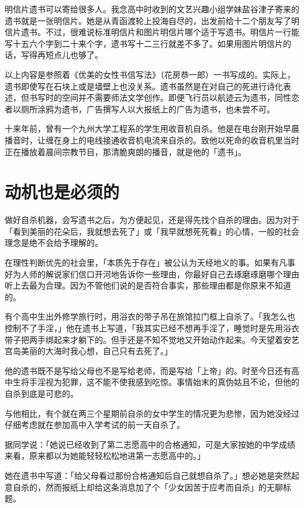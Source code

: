 \documentclass[UTF8]{ctexart}
\begin{document}
明信片遗书可以寄给很多人。我念高中时收到的文艺兴趣小组学妹盐谷津子寄来的遗书就是一张明信片。她是从青函渡轮上投海自尽的，出发前给十二个朋友写了明信片遗书。不过，很难说标准明信片和图片明信片哪个适于写遗书。明信片一行能写十五六个字到二十来个字，遗书写十二三行就差不多了。如果用图片明信片的话，写得再短点儿也够了。

\bigbreak

以上内容是参照着《优美的女性书信写法》（花房恭一郎）一书写成的。实际上，遗书即使写在石块上或是墙壁上也没关系。遗书虽然是在对自己的死进行诗化表述，但书写时的空间并不需要师法文学创作。即便飞行员以航迹云为遗书，同性恋者以厕所涂鸦为遗书，广告撰写人以大报纸上的广告为遗书，也未尝不可。

十来年前，曾有一个九州大学工程系的学生用收音机自杀。他是在电台刚开始早晨播音时，让缠在身上的电线接通收音机电流来自杀的。致他以死命的收音机里当时正在播放着晨间宗教节目，那清脆爽朗的播音，就是他的「遗书」。

\section{动机也是必须的}

做好自杀机器，会写遗书之后，为方便起见，还是得先找个自杀的理由。因为对于「看到美丽的花朵后，我就想去死了」或「我早就想死死看」的心情，一般的社会理念是绝不会给予理解的。

在理性判断优先的社会里，「本质先于存在」被公认为天经地义的事。如果有凡事好为人师的解说家们信口开河地告诉你一些理由，你最好自己去琢磨琢磨哪个理由听上去最为合理。因为不管他们说的是否符合事实，那些理由都是你原来不知道的。

有个高中生出外修学旅行时，用浴衣的带子吊在旅馆拉门框上自杀了。「我怎么也控制不了手淫，」他在遗书上写道，「我其实已经不想再手淫了，睡觉时是先用浴衣带子把两手绑起来才躺下的。但手还是不知不觉地又开始动作起来。今天望着安艺宫岛美丽的大海时我心想，自己只有去死了。」

他的遗书既不是写给父母也不是写给老师，而是写给「上帝」的。时至今日还有高中生将手淫视为犯罪，这不能不使我感到吃惊。事情始末的真伪姑且不论，但他的自杀到底是可悲的。

与他相比，有个就在两三个星期前自杀的女中学生的情况更为悲惨，因为她没经过仔细考虑就在参加高中入学考试的前一天自杀了。

据同学说：「她说已经收到了第二志愿高中的合格通知，可是大家按她的中学成绩来看，原来都以为她能轻轻松松地进第一志愿高中的。」

她在遗书中写道：「给父母看过那份合格通知后自己就想自杀了。」想必她是突然起意自杀的，然而报纸上却给这条消息加了个「少女因苦于应考而自杀」的无聊标题。
\end{document}

